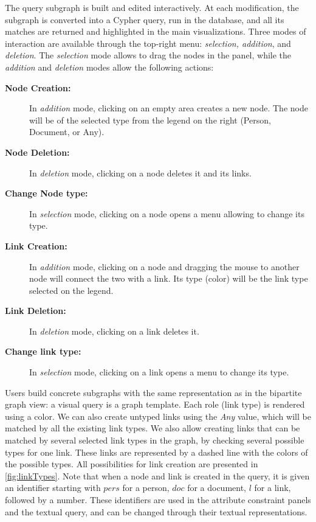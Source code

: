 The query subgraph is built and edited interactively. At each modification, the subgraph is converted into a Cypher query, run in the database, and all its matches are returned and highlighted in the main visualizations. Three modes of interaction are available through the top-right menu: \textit{selection, addition}, and \textit{deletion}. The \textit{selection} mode allows to drag the nodes in the panel, while the \textit{addition} and \textit{deletion} modes allow the following actions:
\begin{description}
    \item[\textbf{Node Creation:}] In \textit{addition} mode, clicking on an empty area creates a new node. The node will be of the selected type from the legend on the right (Person, Document, or Any).
    \item[\textbf{Node Deletion:}] In \textit{deletion} mode, clicking on a node deletes it and its links.
    \item[\textbf{Change Node type:}]  In \textit{selection} mode, clicking on a node opens a menu allowing to change its type.
    \item[\textbf{Link Creation:}] In \textit{addition} mode, clicking on a node and dragging the mouse to another node will connect the two with a link. Its type (color) will be the link type selected on the legend.
    \item[\textbf{Link Deletion:}] In \textit{deletion} mode, clicking on a link deletes it.
    \item[\textbf{Change link type:}] In \textit{selection} mode, clicking on a link opens a menu to change its type.
\end{description}

Users build concrete subgraphs with the same representation as in the bipartite graph view: a visual query is a graph template. %
Each role (link type) is rendered using a color. We can also create untyped links using the \textit{Any} value, which will be matched by all the existing link types. We also allow creating links that can be matched by several selected link types in the graph, by checking several possible types for one link. These links are represented by a dashed line with the colors of the possible types. All possibilities for link creation are presented in \autoref{fig:linkTypes}. Note that when a node and link is created in the query, it is given an identifier starting with $pers$ for a person, $doc$ for a document, $l$ for a link, followed by a number. These identifiers are used in the attribute constraint panels and the textual query, and can be changed through their textual representations.

